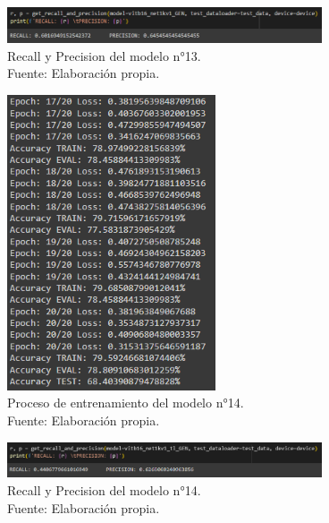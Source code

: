\begin{figure}[H]
	\begin{center}
		\includegraphics[width=0.83\textwidth]{4/figures/model13_rp.PNG}
		\caption[Recall y Precision del modelo n°13]{Recall y Precision del modelo n°13. \\
		Fuente: Elaboración propia.}
		\label{4:fig145}
	\end{center}
\end{figure}

\begin{figure}[H]
	\begin{center}
		\includegraphics[width=0.55\textwidth]{4/figures/model14_train.PNG}
		\caption[Proceso de entrenamiento del modelo n°14]{Proceso de entrenamiento del modelo n°14. \\
		Fuente: Elaboración propia.}
		\label{4:fig146}
	\end{center}
\end{figure}

\begin{figure}[H]
	\begin{center}
		\includegraphics[width=0.83\textwidth]{4/figures/model14_rp.PNG}
		\caption[Recall y Precision del modelo n°14]{Recall y Precision del modelo n°14. \\
		Fuente: Elaboración propia.}
		\label{4:fig147}
	\end{center}
\end{figure}


